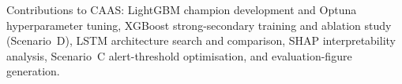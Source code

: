 \vspace{0.5cm}

\noindent
Contributions to CAAS: LightGBM champion development and Optuna hyperparameter
tuning, XGBoost strong-secondary training and ablation study (Scenario~D),
LSTM architecture search and comparison, SHAP interpretability analysis,
Scenario~C alert-threshold optimisation, and evaluation-figure generation.
